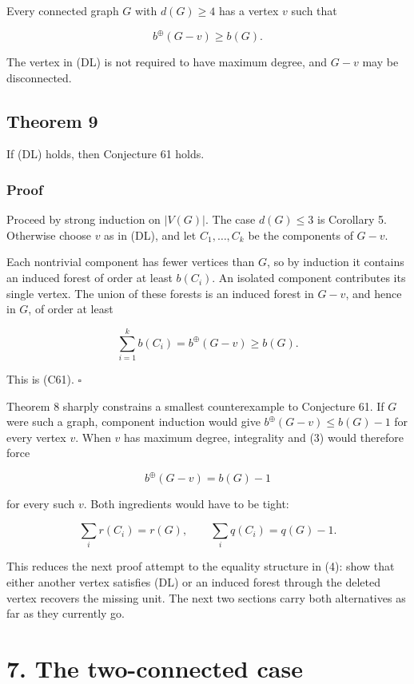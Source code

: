 \documentclass[
  11pt,
  letterpaper,
]{article}
\begin{document}
Every connected graph \(G\) with \(d(G)\ge4\) has a vertex \(v\) such
that

\[
b^\oplus(G-v)\ge b(G).
\tag{DL}
\]

The vertex in (DL) is not required to have maximum degree, and \(G-v\)
may be disconnected.

\subsection{Theorem 9}\label{theorem-9}

If (DL) holds, then Conjecture 61 holds.

\subsubsection{Proof}\label{proof-8}

Proceed by strong induction on \(|V(G)|\). The case \(d(G)\le3\) is
Corollary 5. Otherwise choose \(v\) as in (DL), and let
\(C_1,\ldots,C_k\) be the components of \(G-v\).

Each nontrivial component has fewer vertices than \(G\), so by induction
it contains an induced forest of order at least \(b(C_i)\). An isolated
component contributes its single vertex. The union of these forests is
an induced forest in \(G-v\), and hence in \(G\), of order at least

\[
\sum_{i=1}^k b(C_i)
=b^\oplus(G-v)
\ge b(G).
\]

This is (C61). \(\square\)

Theorem 8 sharply constrains a smallest counterexample to Conjecture 61.
If \(G\) were such a graph, component induction would give
\(b^\oplus(G-v)\le b(G)-1\) for every vertex \(v\). When \(v\) has
maximum degree, integrality and (3) would therefore force

\[
b^\oplus(G-v)=b(G)-1
\]

for every such \(v\). Both ingredients would have to be tight:

\[
\sum_i r(C_i)=r(G),
\qquad
\sum_i q(C_i)=q(G)-1.
\tag{4}
\]

This reduces the next proof attempt to the equality structure in (4):
show that either another vertex satisfies (DL) or an induced forest
through the deleted vertex recovers the missing unit. The next two
sections carry both alternatives as far as they currently go.

\section{7. The two-connected case}\label{the-two-connected-case}
\end{document}
